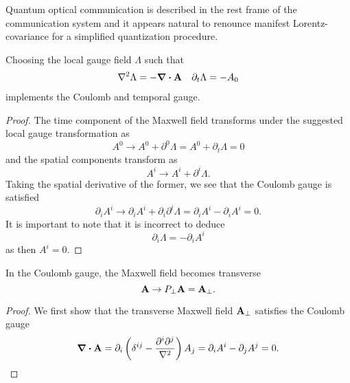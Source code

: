 Quantum optical communication is described in the rest frame of the communication system and it appears natural to renounce manifest Lorentz-covariance for a simplified quantization procedure.
\begin{lemma}
	Choosing the local gauge field $\Lambda$ such that
	\begin{align}
		\laplacian
		\Lambda
		=
		-
		\div\vb{A}
		&&
		\partial_t
		\Lambda
		=
		-
		A_0
	\end{align}
	implements the Coulomb and temporal gauge.
\end{lemma}
\begin{proof}
	The time component of the Maxwell field transforms under the suggested local gauge transformation as
	\begin{equation*}
		A^0
		\to
		A^0
		+
		\partial^0\Lambda
		=
		A^0
		+
		\partial_t\Lambda
		=
		0
	\end{equation*}
	and the spatial components transform as
	\begin{equation*}
		A^i
		\to
		A^i
		+
		\partial^i\Lambda
		.
	\end{equation*}
	Taking the spatial derivative of the former, we see that the Coulomb gauge is satisfied
	\begin{equation*}
		\partial_i A^i
		\to
		\partial_i A^i
		+
		\partial_i \partial^i\Lambda
		=
		\partial_i A^i
		-
		\partial_i A^i
		=
		0
		.
	\end{equation*}
	It is important to note that it is incorrect to deduce
	\begin{equation*}
		\partial_i
		\Lambda
		=
		-
		\partial_i A^i
	\end{equation*}
	as then $A^i=0$.
\end{proof}

\begin{lemma}
	In the Coulomb gauge, the Maxwell field becomes transverse
	\begin{equation}
		\vb{A}
		\to
		P_\perp
		\vb{A}
		=
		\vb{A}_\perp
		.
	\end{equation}
\end{lemma}
\begin{proof}
	We first show that the transverse Maxwell field $\vb{A}_\perp$ satisfies the Coulomb gauge
	\begin{equation*}
		\div\vb{A}
		=
		\partial_i
		\left(
			\delta^{ij}
			-
			\frac{\partial^i\partial^j}{\laplacian}
		\right)
		A_j
		=
		\partial_iA^i
		-
		\partial_jA^j
		=
		0
		.
	\end{equation*}
\end{proof}

